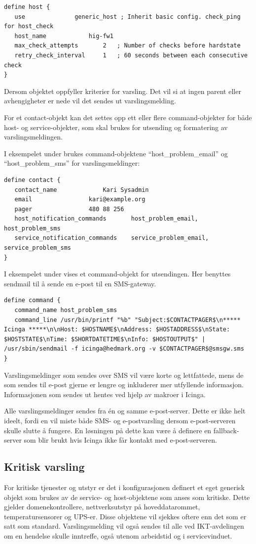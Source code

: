 \begin{lstlisting}[style=example]
define host {
   use 				generic_host ; Inherit basic config. check_ping for host_check
   host_name			hig-fw1
   max_check_attempts   	2 	; Number of checks before hardstate
   retry_check_interval		1 	; 60 seconds between each consecutive check
}
\end{lstlisting}
Dersom objektet oppfyller kriterier for varsling. Det vil si at ingen parent eller avhengigheter er nede vil det sendes ut varslingsmelding.
 
For et contact-objekt kan det settes opp ett eller flere command-objekter for både host- og service-objekter, som skal brukes for utsending og formatering av varslingsmeldingen.  

I eksempelet under brukes command-objektene ``host\_problem\_email'' og ``host\_problem\_sms'' for varslingsmeldinger:
\begin{lstlisting}[style=example]
define contact {
   contact_name 			Kari Sysadmin
   email 				kari@example.org
   pager 				480 88 256 
   host_notification_commands    	host_problem_email, host_problem_sms
   service_notification_commands 	service_problem_email, service_problem_sms
}
\end{lstlisting}

I eksempelet under vises et command-objekt for utsendingen. Her benyttes sendmail\cite{wiki:sendmail} til å sende en e-post til en SMS-gateway.
\begin{lstlisting}[style=example]
define command {
   command_name host_problem_sms
   command_line /usr/bin/printf "%b" "Subject:$CONTACTPAGER$\n***** Icinga *****\n\nHost: $HOSTNAME$\nAddress: $HOSTADDRESS$\nState: $HOSTSTATE$\nTime: $SHORTDATETIME$\nInfo: $HOSTOUTPUT$" | /usr/sbin/sendmail -f icinga@hedmark.org -v $CONTACTPAGER$@smsgw.sms
}
\end{lstlisting}

Varslingsmeldinger som sendes over SMS vil være korte og lettfattede, mens de som sendes til e-post gjerne er lengre og inkluderer mer utfyllende informasjon. Informasjonen som sendes ut hentes ved hjelp av makroer i Icinga\cite{icingamacro}.

Alle varslingsmeldinger sendes fra én og samme e-post-server. Dette er ikke helt ideelt, fordi en vil miste både SMS- og e-postvarsling dersom e-post-serveren skulle slutte å fungere. En løsningen på dette kan være å definere en fallback-server som blir brukt hvis Icinga ikke får kontakt med e-post-serveren. 

\subsection{Kritisk varsling}
For kritiske tjenester og utstyr er det i konfigurasjonen definert et eget generisk objekt som brukes av de service- og host-objektene som anses som kritiske. Dette gjelder domenekontrollere, nettverksutstyr på hoveddatarommet, temperatursensorer og UPS-er. Disse objektene vil sjekkes oftere enn det som er satt som standard. Varslingsmelding vil også sendes til alle ved IKT-avdelingen om en hendelse skulle inntreffe, også utenom arbeidstid og i servicevinduet.

